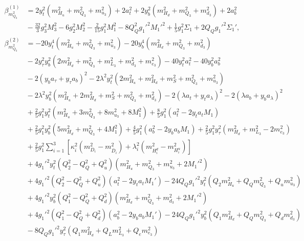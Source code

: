 \documentclass[preprint,amsmath,amssymb,aps,superscriptaddress,prd,showpacs,floatfix,nofootinbib]{revtex4-1}
\begin{document}
\begin{subequations}
\begin{align}
\beta_{m_{Q_3}^2}^{(1)}&=2y_t^2\left ( m_{H_u}^2+m_{Q_3}^2+m_{u_3}^2\right )+2a_t^2+2y_b^2\left ( m_{H_d}^2+m_{Q_3}^2+m_{d_3}^2\right )+2a_b^2\nonumber\\
&{}-\frac{32}{3}g_3^2M_3^2-6g_2^2M_2^2-\frac{2}{15}g_1^2M_1^2-8Q_Q^2g_1'^2M_1'^2+\frac{1}{5}g_1^2\Sigma_1+2Q_Qg_1'^2\Sigma_1',\label{eq:USSMmq222BetaOneLoop}\\
\beta_{m_{Q_3}^2}^{(2)}&=-20y_t^4\left ( m_{H_u}^2+m_{Q_3}^2+m_{u_3}^2 \right )-20y_b^4\left ( m_{H_d}^2+m_{Q_3}^2+m_{d_3}^2 \right )\nonumber\\
&{}-2y_\tau^2y_b^2\left ( 2m_{H_d}^2+m_{Q_3}^2+m_{L_3}^2+m_{d_3}^2+m_{e_3}^2\right )-40y_t^2a_t^2-40y_b^2a_b^2\nonumber\\
&{}-2\left ( y_ba_\tau+y_\tau a_b\right )^2-2\lambda^2y_t^2\left ( 2m_{H_u}^2+m_{H_d}^2+m_S^2+m_{Q_3}^2+m_{u_3}^2\right )\nonumber\\
&{}-2\lambda^2y_b^2\left ( m_{H_u}^2+2m_{H_d}^2+m_S^2+m_{Q_3}^2+m_{d_3}^2\right )-2\left ( \lambda a_t+y_t a_\lambda \right )^2-2\left ( \lambda a_b+y_b a_\lambda \right )^2\nonumber\\
&{}+\frac{2}{5}g_1^2y_t^2\left ( m_{H_u}^2+3m_{Q_3}^2+8m_{u_3}^2 +8M_1^2\right )+\frac{8}{5}g_1^2\left ( a_t^2-2y_ta_tM_1 \right )\nonumber\\
&{}+\frac{2}{5}g_1^2y_b^2\left ( 5m_{H_d}^2+m_{Q_3}^2+4M_1^2\right )+\frac{4}{5}g_1^2\left ( a_b^2-2y_ba_bM_1 \right )+\frac{2}{5}g_1^2y_\tau^2\left ( m_{H_d}^2+m_{L_3}^2-2m_{e_3}^2\right )\nonumber\\
&{}+\frac{2}{5}g_1^2\sum_{i=1}^3\left [ \kappa_i^2\left ( m_{D_i}^2-m_{\overline{D}_i}^2\right )+\lambda_i^2\left ( m_{H_i^d}^2-m_{H_i^u}^2\right )\right ]\nonumber\\
&{}+4g_1'^2y_t^2\left ( Q_2^2-Q_Q^2+Q_u^2\right )\left ( m_{H_u}^2+m_{Q_3}^2+m_{u_3}^2+2M_1'^2\right )\nonumber\\
&{}+4g_1'^2\left ( Q_2^2-Q_Q^2+Q_u^2\right )\left ( a_t^2 -2y_ta_tM_1'\right )-24Q_Qg_1'^2y_t^2\left ( Q_2m_{H_u}^2+Q_Qm_{Q_3}^2+Q_um_{u_3}^2\right )\nonumber\\
&{}+4g_1'^2y_b^2\left ( Q_1^2-Q_Q^2+Q_d^2 \right )\left ( m_{H_d}^2+m_{Q_3}^2+m_{d_3}^2+2M_1'^2\right )\nonumber\\
&{}+4g_1'^2\left ( Q_1^2-Q_Q^2+Q_d^2\right )\left ( a_b^2-2y_ba_bM_1'\right )-24Q_Qg_1'^2y_b^2\left ( Q_1m_{H_d}^2+Q_Qm_{Q_3}^2+Q_dm_{d_3}^2\right )\nonumber\\
&{}-8Q_Qg_1'^2y_\tau^2\left ( Q_1m_{H_d}^2+Q_Lm_{L_3}^2+Q_em_{e_3}^2\right )\nonumber\\

\end{align}
\end{subequations}
\end{document}
